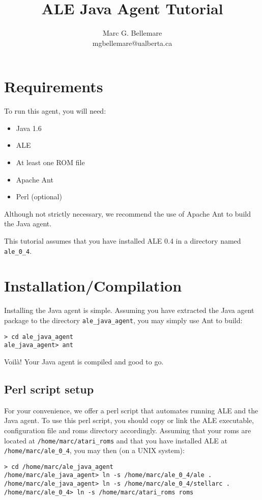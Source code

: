 \documentclass[12pt]{article}
\title{ALE Java Agent Tutorial}
\author{Marc G. Bellemare\\ mgbellemare@ualberta.ca}
\begin{document}
\maketitle

\section{Requirements}

To run this agent, you will need:

\begin{itemize}
  \item{Java 1.6}
  \item{ALE}
  \item{At least one ROM file}
  \item{Apache Ant}
  \item{Perl (optional)}
\end{itemize}

Although not strictly necessary, we recommend the use of Apache Ant to build
the Java agent.

This tutorial assumes that you have installed ALE 0.4 in a directory named
\verb+ale_0_4+.

\section{Installation/Compilation}

Installing the Java agent is simple. Assuming you have extracted the Java agent
package to the directory \verb+ale_java_agent+, you may simply use Ant to build:

\begin{verbatim}
> cd ale_java_agent
ale_java_agent> ant
\end{verbatim}

Voil\`a! Your Java agent is compiled and good to go.

\subsection{Perl script setup}\label{subsec:perl_script}
For your convenience, we offer a perl script that automates running ALE and
the Java agent. To use this perl script, you should copy or link the ALE 
executable, configuration file and roms directory accordingly. Assuming that
your roms are located at \verb+/home/marc/atari_roms+ and that you have 
installed ALE at \verb+/home/marc/ale_0_4+, you may then (on a UNIX system): 

\begin{verbatim}
> cd /home/marc/ale_java_agent
/home/marc/ale_java_agent> ln -s /home/marc/ale_0_4/ale . 
/home/marc/ale_java_agent> ln -s /home/marc/ale_0_4/stellarc . 
/home/marc/ale_0_4> ln -s /home/marc/atari_roms roms
\end{verbatim}
\end{document}
